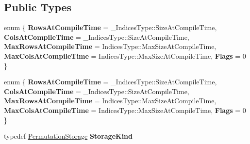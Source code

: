 \subsection*{Public Types}
\begin{DoxyCompactItemize}
\item 
\mbox{\label{struct_eigen_1_1internal_1_1traits_3_01_permutation_wrapper_3_01___indices_type_01_4_01_4_a1f3776bc14461b8f8d2b1615b2feb3a2}} 
enum \{ \newline
{\bfseries Rows\+At\+Compile\+Time} = \+\_\+\+Indices\+Type\+:\+:Size\+At\+Compile\+Time, 
{\bfseries Cols\+At\+Compile\+Time} = \+\_\+\+Indices\+Type\+:\+:Size\+At\+Compile\+Time, 
{\bfseries Max\+Rows\+At\+Compile\+Time} = Indices\+Type\+:\+:Max\+Size\+At\+Compile\+Time, 
{\bfseries Max\+Cols\+At\+Compile\+Time} = Indices\+Type\+:\+:Max\+Size\+At\+Compile\+Time, 
\newline
{\bfseries Flags} = 0
 \}
\item 
\mbox{\label{struct_eigen_1_1internal_1_1traits_3_01_permutation_wrapper_3_01___indices_type_01_4_01_4_abd107b039bb1cde5401bac5ed9e6a759}} 
enum \{ \newline
{\bfseries Rows\+At\+Compile\+Time} = \+\_\+\+Indices\+Type\+:\+:Size\+At\+Compile\+Time, 
{\bfseries Cols\+At\+Compile\+Time} = \+\_\+\+Indices\+Type\+:\+:Size\+At\+Compile\+Time, 
{\bfseries Max\+Rows\+At\+Compile\+Time} = Indices\+Type\+:\+:Max\+Size\+At\+Compile\+Time, 
{\bfseries Max\+Cols\+At\+Compile\+Time} = Indices\+Type\+:\+:Max\+Size\+At\+Compile\+Time, 
\newline
{\bfseries Flags} = 0
 \}
\item 
\mbox{\label{struct_eigen_1_1internal_1_1traits_3_01_permutation_wrapper_3_01___indices_type_01_4_01_4_a73b667d33aed32c6a3d8cb74b9f0c8f7}} 
typedef \hyperlink{struct_eigen_1_1_permutation_storage}{Permutation\+Storage} {\bfseries Storage\+Kind}
\item 
\mbox{\label{struct_eigen_1_1internal_1_1traits_3_01_permutation_wrapper_3_01___indices_type_01_4_01_4_a446f600704e244d9c79bc5a84ca45aee}} 

\end{DoxyCompactItemize}
